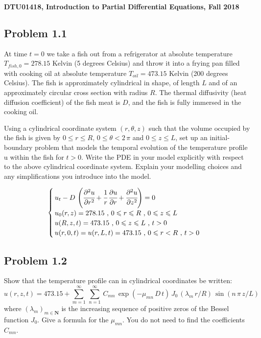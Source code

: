 \documentclass[../main.tex]{subfiles}
\begin{document}
\textbf{DTU01418, Introduction to Partial Differential Equations, Fall 2018}

\subsection{Problem 1.1}

At time $t = 0$ we take a fish out from a refrigerator at absolute temperature $T_{fish,0} = 278.15$ Kelvin (5 degrees Celsius) and throw it into a frying pan filled with cooking oil at absolute temperature $T_{oil} = 473.15$ Kelvin (200 degrees Celsius). The fish is approximately cylindrical in shape, of length $L$ and of an approximately circular cross section with radius $R$. The thermal diffusivity (heat diffusion coefficient) of the fish meat is $D$, and the fish is fully immersed in the cooking oil.

Using a cylindrical coordinate system $(r, \theta, z)$ such that the volume occupied by the fish is given by $0 \leqslant r \leqslant R$, $0 \leqslant \theta < 2 \, \pi$ and $0 \leqslant z \leqslant L$, set up an initial-boundary problem that models the temporal evolution of the temperature profile u within the fish for $t > 0$. Write the PDE in your model explicitly with respect to the above cylindrical coordinate system. Explain your modelling choices and any simplifications you introduce into the model.

\begin{align}
    \begin{cases}
        \, u_t - D \, \left(\cfrac{\partial^2 u}{\partial r^2} + \cfrac{1}{r} \, \cfrac{\partial u}{\partial  r} + \cfrac{\partial^2 u}{\partial z^2} \right) = 0 \\
        \, u_0(r, z) = 278.15 \text{ ,  } 0 \leqslant r \leqslant R \text{ ,  } 0 \leqslant z \leqslant L \\
        \, u(R, z, t) = 473.15 \text{ ,  } 0 \leqslant z \leqslant L \text{ ,  } t > 0 \\
        \, u(r, 0, t) = u(r, L, t) = 473.15 \text{ ,  } 0 \leqslant r < R \text{ ,  } t > 0
    \end{cases} \label{eq:A4_1}
\end{align}

\subsection{Problem 1.2}

Show that the temperature profile can in cylindrical coordinates be written:
\begin{equation} \label{eq:A4_2}
    u(r, z, t) = 473.15 + \sum_{m=1}^{\infty} \, \sum_{n=1}^{\infty} \, C_{mn} \, \exp{(- \mu_{mn} \, D \,t)} \, J_0 \, (\lambda_m \, r / R) \, \sin(n \, \pi \, z / L)
\end{equation}
where $(\lambda_m)_{m \in \mathbf{N}}$ is the increasing sequence of positive zeros of the Bessel function $J_0$. Give a formula for the $\mu_{mn}$. You do not need to find the coefficients $C_{mn}$.
\end{document}
